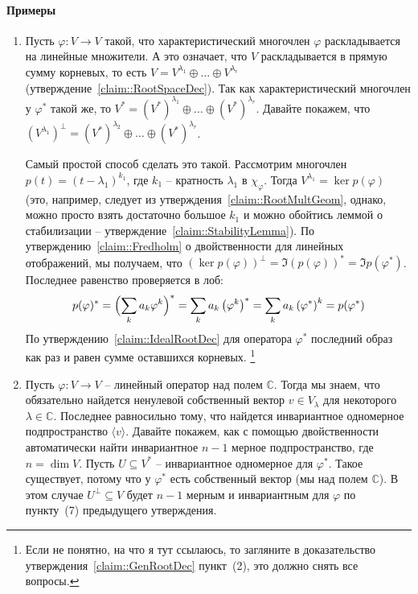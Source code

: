 \paragraph{Примеры}
\begin{enumerate}
\item Пусть $\varphi\colon V\to V$ такой, что характеристический многочлен $\varphi$ раскладывается на линейные множители.
А это означает, что $V$ раскладывается в прямую сумму корневых, то есть $V = V^{\lambda_1}\oplus \ldots \oplus V^{\lambda_r}$ (утверждение~\ref{claim::RootSpaceDec}).
Так как характеристический многочлен у $\varphi^*$ такой же, то $V^* = (V^*)^{\lambda_1}\oplus \ldots \oplus (V^*)^{\lambda_r}$.
Давайте покажем, что $(V^{\lambda_1})^\bot = (V^*)^{\lambda_2}\oplus \ldots \oplus (V^*)^{\lambda_r}$.

Самый простой способ сделать это такой.
Рассмотрим многочлен $p(t) = (t-\lambda_1)^{k_1}$, где $k_1$ -- кратность $\lambda_1$ в $\chi_\varphi$.
Тогда $V^{\lambda_1} = \ker p(\varphi)$ (это, например, следует из утверждения~\ref{claim::RootMultGeom}, однако, можно просто взять достаточно большое $k_1$ и можно обойтись леммой о стабилизации -- утверждение~\ref{claim::StabilityLemma}).
По утверждению~\ref{claim::Fredholm} о двойственности для линейных отображений, мы получаем, что $(\ker p(\varphi))^\bot = \Im (p(\varphi))^* = \Im p(\varphi^*)$.
Последнее равенство проверяется в лоб:
\[
p(\varphi)^* =  \Bigl(\sum_ka_k\varphi^k\Bigr)^* = \sum_ka_k \left(\varphi^k\right)^* = \sum_k a_k \left(\varphi^*\right)^k = p(\varphi^*)
\]
По утверждению~\ref{claim::IdealRootDec} для оператора $\varphi^*$ последний образ как раз и равен сумме оставшихся корневых.%
\footnote{Если не понятно, на что я тут ссылаюсь, то загляните в доказательство утверждения~\ref{claim::GenRootDec} пункт~(2), это должно снять все вопросы.}

\item Пусть $\varphi\colon V\to V$ -- линейный оператор над полем $\mathbb C$.
Тогда мы знаем, что обязательно найдется ненулевой собственный вектор $v\in V_\lambda$ для некоторого $\lambda\in \mathbb C$.
Последнее равносильно тому, что найдется инвариантное одномерное подпространство $\langle v \rangle$.
Давайте покажем, как с помощью двойственности автоматически найти инвариантное $n - 1$ мерное подпространство, где $n = \dim V$.
Пусть $U\subseteq V^*$ -- инвариантное одномерное для $\varphi^*$.
Такое существует, потому что у $\varphi^*$ есть собственный вектор (мы над полем $\mathbb C$).
В этом случае $U^\bot\subseteq V$ будет $n-1$ мерным и инвариантным для $\varphi$ по пункту~(7) предыдущего утверждения.
\end{enumerate}

